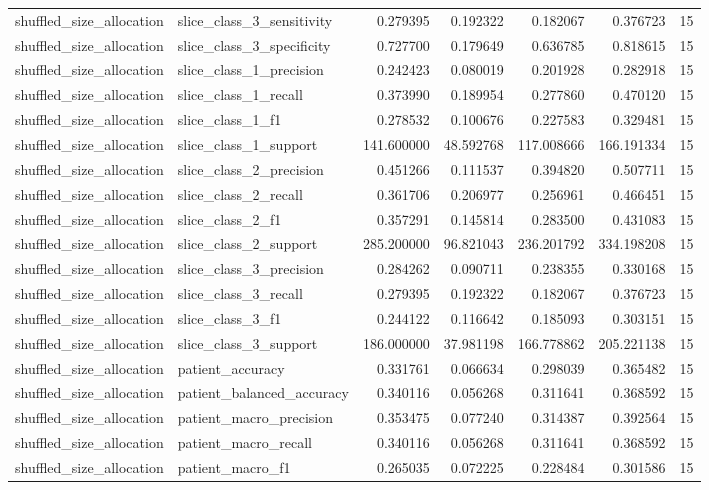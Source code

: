\begin{tabular}{llrrrrr}
shuffled_size_allocation & slice_class_3_sensitivity & 0.279395 & 0.192322 & 0.182067 & 0.376723 & 15 \\
shuffled_size_allocation & slice_class_3_specificity & 0.727700 & 0.179649 & 0.636785 & 0.818615 & 15 \\
shuffled_size_allocation & slice_class_1_precision & 0.242423 & 0.080019 & 0.201928 & 0.282918 & 15 \\
shuffled_size_allocation & slice_class_1_recall & 0.373990 & 0.189954 & 0.277860 & 0.470120 & 15 \\
shuffled_size_allocation & slice_class_1_f1 & 0.278532 & 0.100676 & 0.227583 & 0.329481 & 15 \\
shuffled_size_allocation & slice_class_1_support & 141.600000 & 48.592768 & 117.008666 & 166.191334 & 15 \\
shuffled_size_allocation & slice_class_2_precision & 0.451266 & 0.111537 & 0.394820 & 0.507711 & 15 \\
shuffled_size_allocation & slice_class_2_recall & 0.361706 & 0.206977 & 0.256961 & 0.466451 & 15 \\
shuffled_size_allocation & slice_class_2_f1 & 0.357291 & 0.145814 & 0.283500 & 0.431083 & 15 \\
shuffled_size_allocation & slice_class_2_support & 285.200000 & 96.821043 & 236.201792 & 334.198208 & 15 \\
shuffled_size_allocation & slice_class_3_precision & 0.284262 & 0.090711 & 0.238355 & 0.330168 & 15 \\
shuffled_size_allocation & slice_class_3_recall & 0.279395 & 0.192322 & 0.182067 & 0.376723 & 15 \\
shuffled_size_allocation & slice_class_3_f1 & 0.244122 & 0.116642 & 0.185093 & 0.303151 & 15 \\
shuffled_size_allocation & slice_class_3_support & 186.000000 & 37.981198 & 166.778862 & 205.221138 & 15 \\
shuffled_size_allocation & patient_accuracy & 0.331761 & 0.066634 & 0.298039 & 0.365482 & 15 \\
shuffled_size_allocation & patient_balanced_accuracy & 0.340116 & 0.056268 & 0.311641 & 0.368592 & 15 \\
shuffled_size_allocation & patient_macro_precision & 0.353475 & 0.077240 & 0.314387 & 0.392564 & 15 \\
shuffled_size_allocation & patient_macro_recall & 0.340116 & 0.056268 & 0.311641 & 0.368592 & 15 \\
shuffled_size_allocation & patient_macro_f1 & 0.265035 & 0.072225 & 0.228484 & 0.301586 & 15 \\

\end{tabular}
